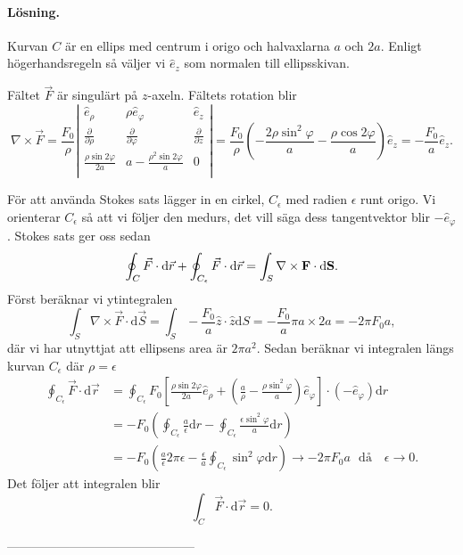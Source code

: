 \documentclass[%
oneside,                 %
final,                   %
10pt]{article}
\begin{document}
\paragraph{Lösning.}
Kurvan $C$ är en ellips med centrum i origo och halvaxlarna $a$ och $2a$. Enligt högerhandsregeln så väljer vi $\hat{e}_{z}$ som normalen till ellipsskivan.

Fältet $\vec{F}$ är singulärt på $z$-axeln.  Fältets rotation blir
\begin{equation}
  \nabla \times \vec{F} = \frac{F_0}{\rho} \left|
  \begin{array}{ccc}
\hat{e}_{\rho} & \rho \hat{e}_{\varphi} & \hat{e}_{z} \\
\frac{\partial}{\partial \rho} & \frac{\partial}{\partial \varphi} &
\frac{\partial}{\partial z} \\
\frac{\rho \sin 2\varphi}{2a} & a- 
\frac{\rho^2\sin 2 \varphi}{a} & 0\\
\end{array}
\right| = \frac{F_0}{\rho} \left(-\frac{2\rho \sin^2\varphi}{a} -
\frac{\rho\cos 2\varphi}{a}\right) \hat{e}_{z} =
- \frac{F_0}{a}\hat{e}_{z}.
\end{equation}

För att använda Stokes sats lägger in en cirkel, $C_\epsilon$ med radien $\epsilon$ runt origo.  Vi orienterar $C_\epsilon$ så att vi följer den medurs, det vill säga dess tangentvektor blir $-\hat{e}_{\varphi}$. Stokes sats ger oss sedan
\begin{equation}
  \oint_C \vec{F} \cdot \mbox{d}\vec{r} + \oint_{C_\epsilon} \vec{F} \cdot \mbox{d}\vec{r}
= \int_S {\bf \nabla \times F \cdot \mbox{d}S}.
\end{equation}
Först beräknar vi ytintegralen
\begin{equation}
  \int_S \nabla \times \vec{F} \cdot \mbox{d}\vec{S} = \int_S -\frac{F_0}{a} \hat{z} \cdot \hat{z} \mbox{d}S = - \frac{F_0}{a} \pi a\times 2a = -2\pi F_0 a,
\end{equation}
där vi har utnyttjat att ellipsens area är $2\pi a^2$.  Sedan beräknar vi integralen längs kurvan $C_\epsilon$ där $\rho = \epsilon$
\begin{align}
  \oint_{C_\epsilon} \vec{F} \cdot \mbox{d}\vec{r} &= \oint_{C_\epsilon} F_0 
\left[\frac{\rho \sin 2\varphi}{2a} \hat{e}_{\rho} + \left(\frac{a}{\rho}-
\frac{\rho \sin^2\varphi}{a}\right) \hat{e}_{\varphi}\right] \cdot 
\left(-\hat{e}_{\varphi}\right) \mbox{d}r \nonumber \\
&= -F_0\left( 
\oint_{C_\epsilon}\frac{a}{\epsilon} \mbox{d}r - \oint_{C_\epsilon}
\frac{\epsilon \sin^2 \varphi}{a} \mbox{d}r\right) \nonumber \\ 
&= -F_0 
\left(\frac{a}{\epsilon} 2\pi \epsilon - \frac{\epsilon}{a} \oint_{C_\epsilon}
\sin^2 \varphi \mbox{d}r\right) \to -2\pi F_0 a \,\,\,\,\mbox{då } \,\,\,\,
\epsilon \to 0.
\end{align}
Det följer att integralen blir
\begin{equation}
  \int_C \vec{F} \cdot \mbox{d}\vec{r} = 0.
\end{equation}

---------------------------------------------


\end{document}
